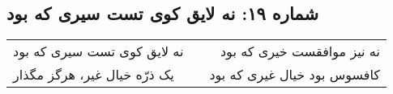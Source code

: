\begin{center}
\section*{شماره ۱۹: نه لایق کوی تست سیری که بود}
\label{sec:019}
\begin{longtable}{l p{0.5cm} r}
نه لایق کوی تست سیری که بود
&&
نه نیز موافقست خیری که بود
\\
یک ذرّه خیال غیر، هرگز مگذار
&&
کافسوس بود خیال غیری که بود
\\
\end{longtable}
\end{center}
